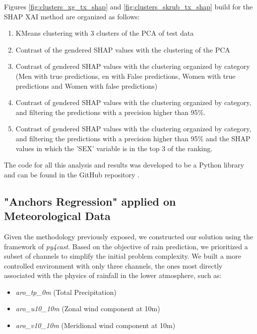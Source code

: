 Figures \ref{fig:clusters_xg_tx_shap} and \ref{fig:clusters_skrub_tx_shap} build for the SHAP XAI method are organized as follows:
\begin{enumerate}
    \item KMeans clustering with 3 clusters of the PCA of test data
    \item Contrast of the gendered SHAP values with the clustering of the PCA
	\item Contrast of gendered SHAP values with the clustering organized by category (Men with true predictions, en with False predictions, Women with true predictions and Women with false predictions)
	\item Contrast of gendered SHAP values with the clustering organized by category, and filtering the predictions with a precision higher than 95\%.
	\item Contrast of gendered SHAP values with the clustering organized by category, and filtering the predictions with a precision higher than 95\% and the SHAP values in which the 'SEX' variable is in the top 3 of the ranking.
\end{enumerate}

The code for all this analysis and results was developed to be a Python library and can be found in the GitHub repository \cite{fairness-experiments}.

\FloatBarrier


\subsection{"Anchors Regression" applied on Meteorological Data}
Given the methodology previously exposed, we constructed our solution using the framework of \textit{py4cast}.
Based on the objective of rain prediction, we prioritized a subset of channels to simplify the initial problem complexity. We built a more controlled environment with only three channels, the ones most directly associated with the physics of rainfall in the lower atmosphere, such as:
\begin{itemize}
	\item \textit{aro\_tp\_0m} (Total Precipitation)
	\item \textit{aro\_u10\_10m} (Zonal wind component at 10m)
    \item \textit{aro\_v10\_10m} (Meridional wind component at 10m)
\end{itemize}

